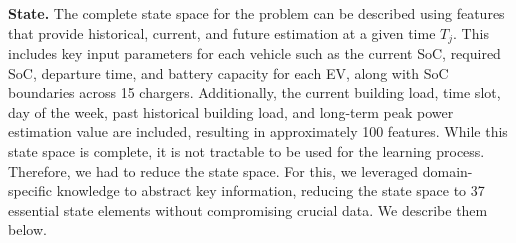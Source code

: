 {\bf State.}
The complete state space for the problem can be described using features that provide historical, current, and future estimation at a given time $T_j$.
This includes key input parameters for each vehicle such as the current SoC, required SoC, departure time, and battery capacity for each EV, along with SoC boundaries across 15 chargers. Additionally, the current building load, time slot, day of the week, past historical building load, and long-term peak power estimation value are included, resulting in approximately 100 features. While this state space is complete, it is not tractable to be used for the learning process. Therefore, we had to reduce the state space. For this,
we leveraged domain-specific knowledge to abstract key information, reducing the state space to 37 essential state elements without compromising crucial data. We describe them below.
